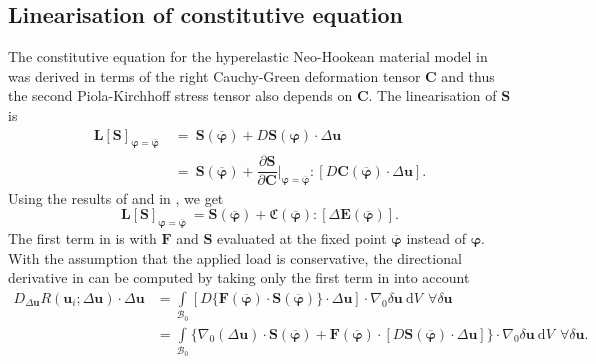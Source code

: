 \subsection{Linearisation of constitutive equation}
The constitutive equation for the hyperelastic Neo-Hookean material model in  was derived in terms of the right Cauchy-Green deformation tensor $\mathbf{C}$ and thus the second Piola-Kirchhoff stress tensor also depends on $\mathbf{C}$. The linearisation of $\mathbf{S}$ is
\begin{align}
\mathbf{L}\left[ \mathbf{S} \right]_{\bm{\varphi} = \overline{\bm{\varphi}}} \ &= \ \mathbf{S}(\overline{\bm{\varphi}}) + D \mathbf{S}(\bm{\varphi}) \cdot \Delta\mathbf{u} \nonumber \\
&= \ \mathbf{S}(\overline{\bm{\varphi}}) + \dfrac{\partial \mathbf{S}}{\partial \mathbf{C}} \Big|_{\bm{\varphi} = \overline{\bm{\varphi}}} : \left[ D \mathbf{C}(\overline{\bm{\varphi}}) \cdot \Delta\mathbf{u} \right].
\label{eq:2.16}
\end{align}
Using the results of  and  in , we get
\begin{equation}
\mathbf{L}\left[ \mathbf{S} \right]_{\bm{\varphi} = \overline{\bm{\varphi}}} \ = \mathbf{S}(\overline{\bm{\varphi}}) + \mathfrak{C}(\overline{\bm{\varphi}}) : \left[ \Delta \mathbf{E}(\overline{\bm{\varphi}}) \right].
\label{eq:2.19}
\end{equation} \newline 
The first term in  is  with $\mathbf{F}$ and $\mathbf{S}$ evaluated at the fixed point $\overline{\bm{\varphi}}$ instead of $\bm{\varphi}$. With the assumption that the applied load is conservative, the directional derivative in  can be computed by taking only the first term in  into account
\begin{align}
D_{\Delta\mathbf{u}} R(\mathbf{u}_i; \Delta \mathbf{u}) \cdot \Delta\mathbf{u} &= \int\limits_{\mathcal{B}_0} \left[ D \{ \mathbf{F}(\overline{\bm{\varphi}}) \cdot \mathbf{S}(\overline{\bm{\varphi}})\} \cdot \Delta\mathbf{u} \right] \cdot \nabla_0 \delta\mathbf{u} \ \mathrm{d}V \ \ \forall \delta\mathbf{u} \nonumber \\
&= \int\limits_{\mathcal{B}_0} \Big\lbrace \nabla_0 (\Delta\mathbf{u}) \cdot \mathbf{S}(\overline{\bm{\varphi}}) + \mathbf{F}(\overline{\bm{\varphi}}) \cdot \left[ D \mathbf{S}(\overline{\bm{\varphi}}) \cdot \Delta\mathbf{u} \right] \Big\rbrace \cdot \nabla_0 \delta\mathbf{u} \ \mathrm{d}V \ \ \forall \delta\mathbf{u}.
\label{eq:2.20}
\end{align}
